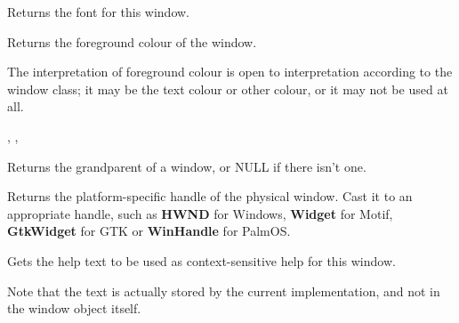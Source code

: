 \label{wxwindowgetfont}


Returns the font for this window.




\label{wxwindowgetforegroundcolour}


Returns the foreground colour of the window.


The interpretation of foreground colour is open to interpretation according
to the window class; it may be the text colour or other colour, or it may not
be used at all.


,\rtfsp
{},\rtfsp
{}


\label{wxwindowgetgrandparent}


Returns the grandparent of a window, or NULL if there isn't one.


\label{wxwindowgethandle}


Returns the platform-specific handle of the physical window. Cast it to an appropriate
handle, such as {\bf HWND} for Windows, {\bf Widget} for Motif, {\bf GtkWidget} for GTK or {\bf WinHandle} for PalmOS.




\label{wxwindowgethelptext}


Gets the help text to be used as context-sensitive help for this window.

Note that the text is actually stored by the current  implementation,
and not in the window object itself.

